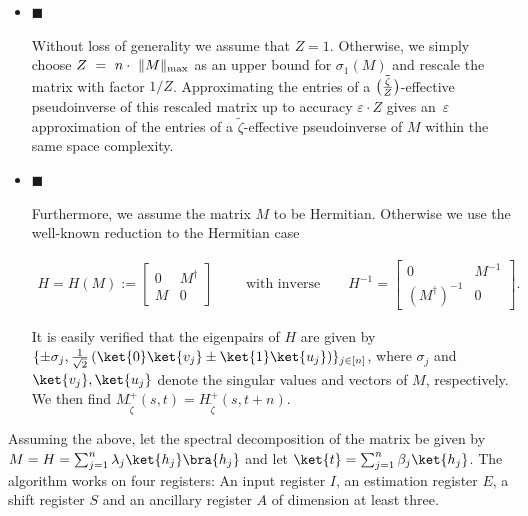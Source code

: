 \documentclass[10pt,a4paper]{article}
\begin{document}
\begin{itemize}


\item[] 
$\blacksquare$ 


Without loss of generality we assume that $Z=1$. Otherwise, we simply choose $Z\nobreak\ =\nobreak\ n\cdot\nobreak\ \|M\|_{\max}$ as an upper bound for $\sigma_{1}(M)$ and rescale the matrix with factor $1/Z$.
Approximating the entries of a $\tilde{\big{(}\frac{\zeta}{Z}\big{)}}$-effective pseudoinverse of this rescaled matrix up to accuracy $\varepsilon\cdot Z$ gives an $\varepsilon$ approximation of the entries of a $\tilde{\zeta}$-effective pseudoinverse of $M$ within the same space complexity.\par





\item[] 
$\blacksquare$ 


Furthermore, we assume the matrix $M$ to be Hermitian. Otherwise we use the well-known reduction to the Hermitian case\par


\[\begin{gathered}
\displaystyle H=H(M):=\begin{bmatrix}0&M^{{\dagger}}\\
M&0\end{bmatrix}\qquad\text{ with inverse}\qquad H^{-1}=\begin{bmatrix}0&M^{-1}\\
(M^{\dagger})^{-1}&0\end{bmatrix}.
\end{gathered}\]


It is easily verified that the eigenpairs of $H$ are given by $\{\pm\sigma_{j},\frac{1}{\sqrt{2}}\left(\ket{0}\ket{v_{j}}\pm\ket{1}\ket{u_{j}}\right)\}_{j\in[n]}$, where $\sigma_{j}$ and $\ket{v_{j}},\ket{u_{j}}$ denote the singular values and vectors of $M$, respectively. We then find $M^{+}_{\widetilde{\zeta}}(s,t)=H^{+}_{\widetilde{\zeta}}(s,t+n)$.\par





\end{itemize}


Assuming the above, let the spectral decomposition of the matrix be given by $M=H=\sum_{j=1}^{n}\lambda_{j}\ket{h_{j}}\bra{h_{j}}$ and let $\ket{t}=\sum_{j=1}^{n}\beta_{j}\ket{h_{j}}$.
The algorithm works on four registers: An input register $I$, an estimation register $E$, a shift register $S$ and an ancillary register $A$ of dimension at least three.\par
\end{document}
